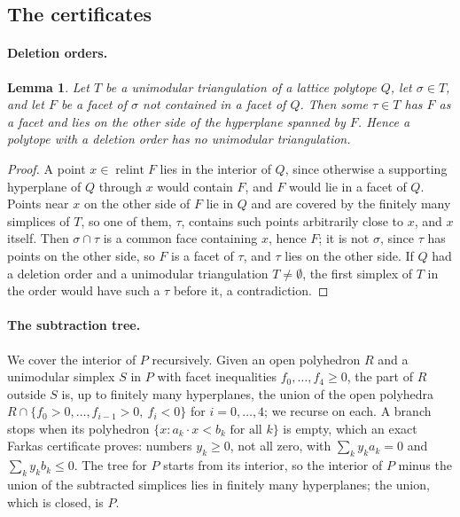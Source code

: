 \documentclass[11pt]{article}
\newtheorem{lemma}[theorem]{Lemma}
\theoremstyle{definition}
\newcommand{\relint}{\operatorname{relint}}
\begin{document}
\begin{appendices}
\clearpage
\section{The certificates}\label{app:certs}

\paragraph{Deletion orders.}
\begin{lemma}\label{lem:delete}
Let $T$ be a unimodular triangulation of a lattice polytope $Q$, let
$\sigma\in T$, and let $F$ be a facet of $\sigma$ not contained in a facet
of $Q$. Then some $\tau\in T$ has $F$ as a facet and lies on the other side
of the hyperplane spanned by $F$. Hence a polytope with a deletion order has
no unimodular triangulation.
\end{lemma}

\begin{proof}
A point $x\in\relint F$ lies in the interior of $Q$, since otherwise a
supporting hyperplane of $Q$ through $x$ would contain $F$, and $F$ would
lie in a facet of $Q$. Points near $x$ on the other side of $F$ lie in $Q$
and are covered by the finitely many simplices of $T$, so one of them,
$\tau$, contains such points arbitrarily close to $x$, and $x$ itself. Then
$\sigma\cap\tau$ is a common face containing $x$, hence $F$; it is not
$\sigma$, since $\tau$ has points on the other side, so $F$ is a facet of
$\tau$, and $\tau$ lies on the other side. If $Q$ had a deletion order and
a unimodular triangulation $T\ne\emptyset$, the first simplex of $T$ in the
order would have such a $\tau$ before it, a contradiction.
\end{proof}

\paragraph{The subtraction tree.}
We cover the interior of $P$ recursively. Given an open polyhedron $R$ and a
unimodular simplex $S$ in $P$ with facet inequalities $f_0,\dots,f_4\ge0$,
the part of $R$ outside $S$ is, up to finitely many hyperplanes, the union of
the open polyhedra $R\cap\{f_0>0,\dots,f_{i-1}>0,\ f_i<0\}$ for
$i=0,\dots,4$; we recurse on each. A branch stops when its polyhedron
$\{x: a_k\cdot x<b_k \text{ for all } k\}$ is empty, which an exact Farkas
certificate proves: numbers $y_k\ge0$, not all zero, with
$\sum_k y_ka_k=0$ and $\sum_k y_kb_k\le0$. The tree for $P$ starts from its
interior, so the interior of $P$ minus the union of the subtracted simplices
lies in finitely many hyperplanes; the union, which is closed, is $P$.


\end{appendices}
\end{document}
